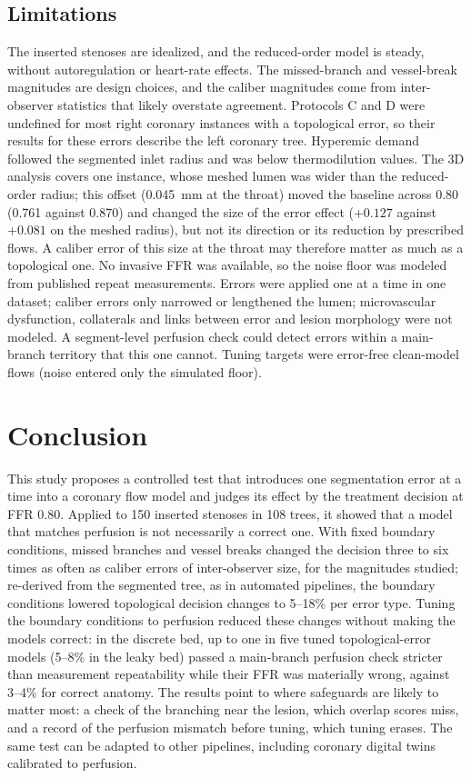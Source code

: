 \documentclass[journal,twoside,web]{ieeecolor}
\begin{document}
\subsection{Limitations}
The inserted stenoses are idealized, and the reduced-order model is steady, without autoregulation or heart-rate
effects. The missed-branch and vessel-break magnitudes are design choices, and the caliber magnitudes come from
inter-observer statistics that likely overstate agreement. Protocols C and D were undefined for most right coronary
instances with a topological error, so their results for these errors describe the left coronary tree. Hyperemic
demand followed the segmented inlet radius and was below thermodilution values. The 3D analysis covers one instance, whose
meshed lumen was wider than the reduced-order radius; this offset (0.045~mm at the throat) moved the baseline
across 0.80 (0.761 against 0.870) and changed the size of the error effect ($+0.127$ against $+0.081$ on the meshed radius), but not its
direction or its reduction by prescribed flows. A caliber error of this size at the throat may therefore matter as much as a topological one. No invasive FFR was available, so the noise floor was modeled from published repeat
measurements. Errors were applied one at a time in one dataset; caliber errors only narrowed or lengthened the lumen; microvascular
dysfunction, collaterals and links between error and lesion morphology were not modeled. A segment-level perfusion
check could detect errors within a main-branch territory that this one cannot. Tuning targets were error-free clean-model flows
(noise entered only the simulated floor).

\section{Conclusion}
This study proposes a controlled test that introduces one segmentation error at a time into a coronary flow model and judges
its effect by the treatment decision at FFR 0.80. Applied to 150 inserted stenoses in 108 trees, it showed that a model that matches
perfusion is not necessarily a correct one. With fixed boundary conditions, missed branches and vessel breaks changed the decision three to six times
as often as caliber errors of inter-observer size, for the magnitudes studied; re-derived from the segmented tree, as in automated pipelines, the boundary conditions lowered topological decision changes to 5--18\% per error type. Tuning the boundary conditions to perfusion reduced these
changes without making the models correct: in the discrete bed, up to one in five tuned topological-error models (5--8\% in the leaky bed) passed a main-branch perfusion check stricter than
measurement repeatability while their FFR was materially wrong, against 3--4\% for correct anatomy. The results
point to where safeguards are likely to matter most: a check of the branching near the lesion, which overlap scores miss, and
a record of the perfusion mismatch before tuning, which tuning erases. The same test can be adapted to other
pipelines, including coronary digital twins calibrated to perfusion.
\end{document}
